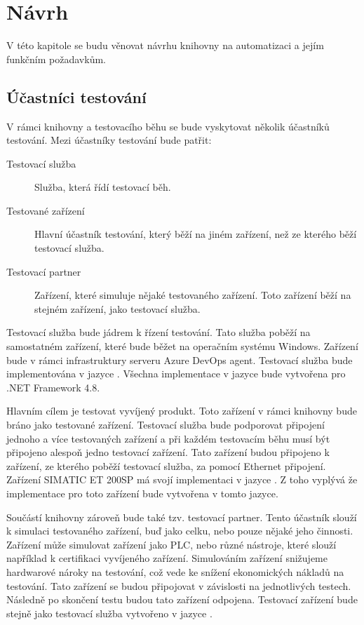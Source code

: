 \chapter{Návrh}\label{chap:design}

V této kapitole se budu věnovat návrhu knihovny na automatizaci a jejím funkčním požadavkům.

\section{Účastníci testování}\label{sec:participants}
V rámci knihovny a testovacího běhu se bude vyskytovat několik účastníků testování. Mezi účastníky testování bude patřit:

\begin{description}
    \item[Testovací služba] Služba, která řídí testovací běh.
    \item[Testované zařízení] Hlavní účastník testování, který běží na jiném zařízení, než ze kterého běží testovací služba. 
    \item[Testovací partner] Zařízení, které simuluje nějaké testovaného zařízení. Toto zařízení běží na stejném zařízení, jako testovací služba. 
\end{description}

Testovací služba bude jádrem k řízení testování. Tato služba poběží na samostatném zařízení, které bude běžet na operačním systému Windows. Zařízení bude v rámci infrastruktury serveru Azure DevOps agent. Testovací služba bude implementována v jazyce \csharp{}. Všechna implementace v jazyce \csharp{} bude vytvořena pro .NET Framework 4.8. 

Hlavním cílem je testovat vyvíjený produkt. Toto zařízení v rámci knihovny bude bráno jako testované zařízení. Testovací služba bude podporovat připojení jednoho a více testovaných zařízení a při každém testovacím běhu musí být připojeno alespoň jedno testovací zařízení. Tato zařízení budou připojeno k zařízení, ze kterého poběží testovací služba, za pomocí Ethernet připojení. Zařízení SIMATIC ET 200SP má svojí implementaci v jazyce \cpp{}. Z toho vyplývá že implementace pro toto zařízení bude vytvořena v tomto jazyce. 

Součástí knihovny zároveň bude také tzv. testovací partner. Tento účastník slouží k simulaci testovaného zařízení, buď jako celku, nebo pouze nějaké jeho činnosti. Zařízení může simulovat zařízení jako PLC, nebo různé nástroje, které slouží například k certifikaci vyvíjeného zařízení. Simulováním zařízení snižujeme hardwarové nároky na testování, což vede ke snížení ekonomických nákladů na testování. Tato zařízení se budou připojovat v závislosti na jednotlivých testech. Následně po skončení testu budou tato zařízení odpojena. Testovací zařízení bude stejně jako testovací služba vytvořeno v jazyce \csharp{}.

